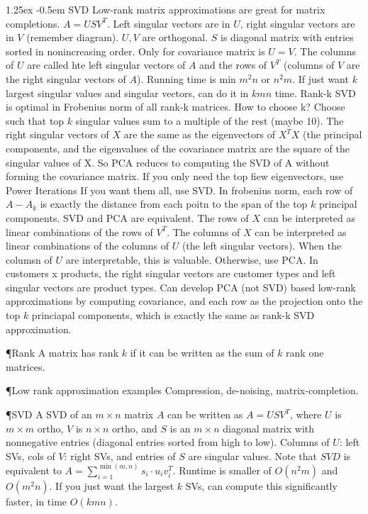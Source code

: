 \documentclass[8pt]{article}
\makeatletter
\newlength{\norm}
\newlength{\nrm}
\newlength{\sm}
\renewcommand{\paragraph}{%
  \@startsection{paragraph}{4}%
  {\z@}{1.25ex \@plus 2pt \@minus 2pt}{-0.5em}%
  {\fontsize{\f@size}{\nrm}\normalfont\bfseries}%
}
\makeatother
\begin{document}
\paragraph{SVD} Low-rank matrix approximations are great for matrix completions. $A = USV^T$. Left singular vectors are in $U$, right singular vectors are in $V$ (remember diagram). $U, V$ are orthogonal. $S$ is diagonal matrix with entries sorted in nonincreasing order. Only for covariance matrix is $U = V$. The columns of $U$ are called hte left singular vectors of $A$ and the rows of $V^T$ (columns of $V$ are the right singular vectors of $A$). Running time is min $m^2n$ or $n^2m$. If just want $k$ largest singular values and singular vectors, can do it in $kmn$ time. Rank-k SVD is optimal in Frobenius norm of all rank-k matrices. How to choose k? Choose such that top $k$ singular values sum to a multiple of the rest (maybe 10). The right singular vectors of $X$ are the same as the eigenvectors of $X^TX$ (the principal components, and the eigenvalues of the covariance matrix are the square of the singular values of X. So PCA reduces to computing the SVD of A without forming the covariance matrix. If you only need the top fiew eigenvectors, use Power Iterations If you want them all, use SVD. In frobenius norm, each row of $A - A_k$ is exactly the distance from each poitn to the span of the top $k$ principal components. SVD and PCA are equivalent. The rows of $X$ can be interpreted as linear combinations of the rows of $V^T$. The columns of $X$ can be interpreted as linear combinations of the columns of $U$ (the left singular vectors). When the columsn of $U$ are interpretable, this is valuable. Otherwise, use PCA. In customers x products, the right singular vectors are customer types and left singular vectors are product types. Can develop PCA (not SVD) based low-rank approximations by computing covariance, and each row as the projection onto the top $k$ princiapal components, which is exactly the same as rank-k SVD approximation. 


  \P{Rank} A matrix has rank $k$ if it can be written as the sum of $k$ rank one matrices.

  \P{Low rank approximation examples} Compression, de-noising, matrix-completion.

  \P{SVD} A SVD of an $m \times n$ matrix $A$ can be written as $A = USV^T$, where $U$ is $m\times m$ ortho, $V$ is $n \times n$ ortho, and $S$ is an $m \times n$ diagonal matrix with nonnegative entries (diagonal entries sorted from high to low).  Columns of $U$: left SVs, cols of $V$: right SVs, and entries of $S$ are singular values.  Note that $SVD$ is equivalent to $A = \sum_{i=1}^{\min(m, n)} s_i \cdot u_i v_i^T$.  Runtime is smaller of $O(n^2m)$ and $O(m^2 n)$.  If you just want the largest $k$ SVs, can compute this significantly faster, in time $O(kmn)$.  
  
\end{document}
